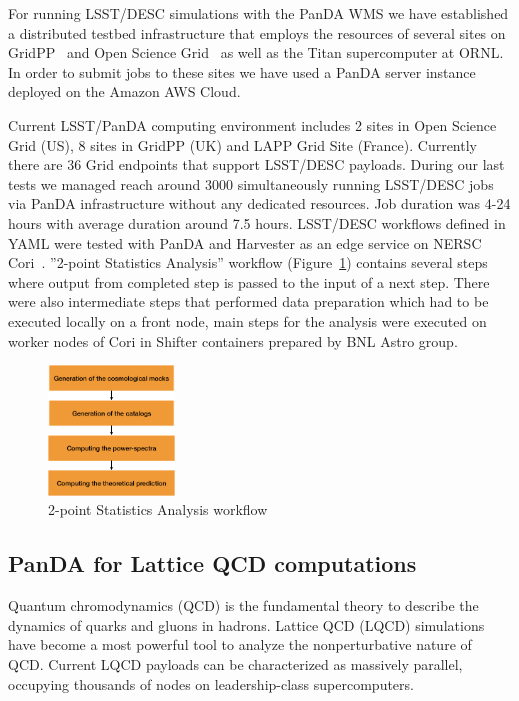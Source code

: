 \documentclass{webofc}
\begin{document}
For running LSST/DESC simulations with the PanDA WMS we have established a distributed testbed infrastructure that employs the resources of several sites on GridPP~\cite{GridPP_Collaboration_2005} and Open Science Grid~\cite{Pordes_2007} as well as the Titan supercomputer at ORNL. In order to submit jobs to these sites we have used a PanDA server instance deployed on the Amazon AWS Cloud. 

Current LSST/PanDA computing environment includes 2 sites in Open Science Grid (US), 8 sites in GridPP (UK) and LAPP Grid Site (France). Currently there are 36 Grid endpoints that support LSST/DESC payloads. During our last tests we managed reach around 3000 simultaneously running LSST/DESC jobs via PanDA infrastructure without any dedicated resources. Job duration was 4-24 hours with average duration around 7.5 hours.
LSST/DESC workflows defined in YAML were tested with PanDA and Harvester as an edge service on NERSC Cori~\cite{NERSC_Cori}. ''2-point Statistics Analysis'' workflow (Figure~\ref{fig:lsst_desc_2pt_stats}) contains several steps where output from completed step is passed to the input of a next step. There were also intermediate steps that performed data preparation which had to be executed locally on a front node, main steps for the analysis were executed on worker nodes of Cori in Shifter containers prepared by BNL Astro group.



\begin{figure}
  \centering
  \includegraphics[width=0.30\textwidth]{figures/LSST_2point_statistics.png}
  \caption{2-point Statistics Analysis workflow}
  \label{fig:lsst_desc_2pt_stats}
\end{figure}


\subsection{PanDA for Lattice QCD computations} \label{section_lqcd}

Quantum chromodynamics (QCD) is the fundamental theory to describe the dynamics of quarks and gluons in hadrons.
Lattice QCD (LQCD) simulations~\cite{LQCD_Matsufuru} have become a most powerful tool to analyze the nonperturbative nature of QCD.
Current LQCD payloads can be characterized as massively parallel, occupying thousands of nodes on leadership-class supercomputers. 
\end{document}
